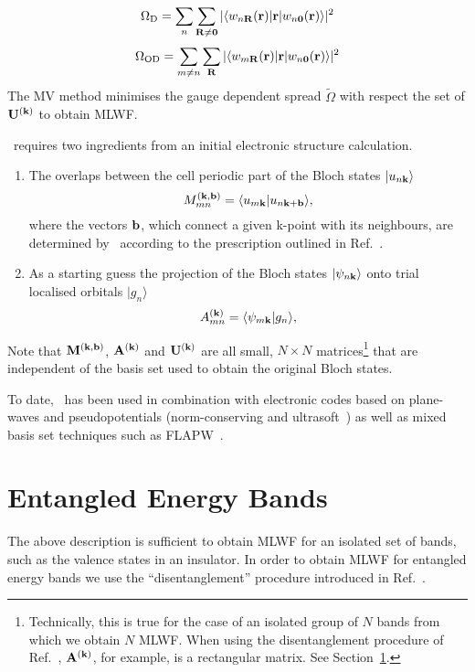 \begin{equation}
\Omega_{\rm D}=\sum_n \sum_{{\bf R}\neq{\bf 0}} |\langle w_{n{\bf
    R}}({\bf r})| {\bf r} | w_{n{\bf 0}}({\bf r}) \rangle|^2
\end{equation}
\begin{equation}
\Omega_{\rm OD}=\sum_{m\neq n} \sum_{{\bf R}} |\langle w_{m{\bf R}}({\bf
  r})| {\bf r} | w_{n{\bf 0}}({\bf r}) \rangle |^2
\end{equation}
The MV method minimises the gauge dependent spread $\tilde{\Omega}$
with respect the set of $\mathbf{U}^{(\mathbf{k})}$ to obtain MLWF.

\wannier\ requires two ingredients from an initial electronic
structure calculation.
\begin{enumerate}
\item The overlaps between the cell periodic part of the Bloch states
  $|u_{n{\bf k}}\rangle$
\begin{equation}
M_{mn}^{(\bf{k,b})}=\langle u_{m{\bf k}}|u_{n{\bf k}+{\bf b}}\rangle,
\end{equation}
where the vectors ${\bf b}$, which connect a given k-point with its
neighbours, are determined by \wannier\ according to the prescription
outlined in Ref.~\cite{marzari-prb97}.
\item As a starting guess the projection of the Bloch states
  $|\psi_{n\bf{k}}\rangle$ onto trial localised orbitals $|g_{n}\rangle$
\begin{equation}
A_{mn}^{(\bf{k})}=\langle \psi_{m{\bf k}}|g_{n}\rangle,
\end{equation}
\end{enumerate}
Note that $\mathbf{M}^{(\mathbf{k},\mathbf{b})}$, $\mathbf{A}^{(\mathbf{k})}$ and $\mathbf{U}^{(\mathbf{k})}$ are all small, $N \times N$
matrices\footnote{Technically, this is true for the case of an
  isolated group of $N$ bands from which we obtain $N$ MLWF. When
  using the disentanglement procedure of Ref.~\cite{souza-prb01},
  $\mathbf{A}^{(\mathbf{k})}$, for example, is a rectangular matrix. See
  Section~\ref{sec:disentangle}.}  that are independent of the basis
set used to obtain the original Bloch states.

To date, \wannier\ has been used in combination with electronic codes
based on plane-waves and pseudopotentials (norm-conserving and
ultrasoft~\cite{vanderbilt-prb90}) as well as mixed basis set techniques such as
FLAPW~\cite{posternak-prb02}.

\section{Entangled Energy Bands}\label{sec:disentangle}
The above description is sufficient to obtain MLWF for an isolated set
of bands, such as the valence states in an insulator. In order to
obtain MLWF for entangled energy bands we use the ``disentanglement''
procedure introduced in Ref.~\cite{souza-prb01}.

